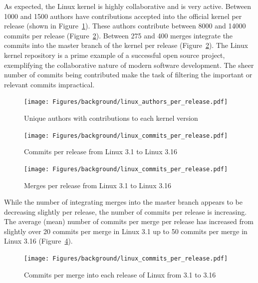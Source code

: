 As expected, the Linux kernel is highly collaborative and is very
active. Between 1000 and 1500 authors have contributions accepted into
the official kernel per release (shown in
Figure~\ref{fig:linux_authors_per_release}). These authors contribute
between 8000 and 14000 commits per release
(Figure~\ref{fig:linux_commits_per_release}). Between 275 and 400 merges
integrate the commits into the master branch of the kernel per release
(Figure~\ref{fig:linux_commits_per_release}). The Linux kernel
repository is a prime example of a successful open source project,
exemplifying the collaborative nature of modern software development.
The sheer number of commits being contributed make the task of filtering
the important or relevant commits impractical.

\begin{figure}[htpb]
  \centering
  \texttt{[image: Figures/background/linux\_authors\_per\_release.pdf]}
  \caption{Unique authors with contributions to each kernel version}
  \label{fig:linux_authors_per_release}
\end{figure}

\begin{figure}[htpb]
  \centering
  \texttt{[image: Figures/background/linux\_commits\_per\_release.pdf]}
  \caption{Commits per release from Linux 3.1 to Linux 3.16}
  \label{fig:linux_commits_per_release}
\end{figure}

\begin{figure}[htpb]
  \centering
  \texttt{[image: Figures/background/linux\_commits\_per\_release.pdf]}
  \caption{Merges per release from Linux 3.1 to Linux 3.16}
  \label{fig:linux_merges_per_release}
\end{figure}

While the number of integrating merges into the master branch appears to
be decreasing slightly per release, the number of commits per release is
increasing. The average (mean) number of commits per merge per release
has increased from slightly over 20 commits per merge in Linux 3.1 up to
50 commits per merge in Linux 3.16
(Figure~\ref{fig:linux_commits_per_merge_per_release}).

\begin{figure}[htpb]
  \centering
  \texttt{[image: Figures/background/linux\_commits\_per\_release.pdf]}
  \caption{Commits per merge into each release of Linux from 3.1 to 3.16
    }
  \label{fig:linux_commits_per_merge_per_release}
\end{figure}


